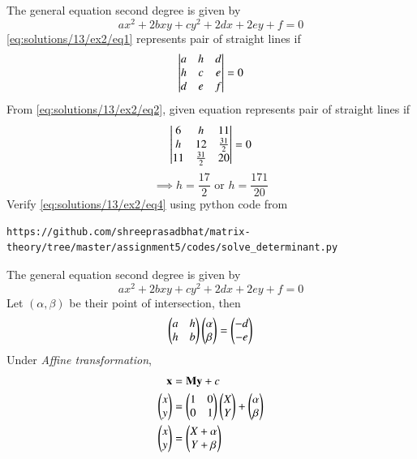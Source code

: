 The general equation second degree is given by
\begin{equation}\label{eq:solutions/13/ex2/eq1}
	ax^2 + 2bxy + cy^2 + 2dx + 2ey + f = 0
\end{equation}
\eqref{eq:solutions/13/ex2/eq1} represents pair of straight lines if
\begin{equation}\label{eq:solutions/13/ex2/eq2}
	\begin{vmatrix} a & h & d\\
			h & c & e\\
			d & e & f\end{vmatrix} = 0
\end{equation}
From \eqref{eq:solutions/13/ex2/eq2}, given equation represents pair of straight lines if 
\begin{equation}\label{eq:solutions/13/ex2/eq3}
	\begin{vmatrix} 6 & h & 11\\
			h & 12 & \frac{31}{2}\\
			11 & \frac{31}{2} & 20\end{vmatrix} = 0
\end{equation}
\begin{equation}\label{eq:solutions/13/ex2/eq4}
	\implies h = \frac{17}{2} \text{ or } h = \frac{171}{20}
\end{equation}
Verify  \eqref{eq:solutions/13/ex2/eq4} using python code from
\begin{lstlisting}
https://github.com/shreeprasadbhat/matrix-theory/tree/master/assignment5/codes/solve_determinant.py
\end{lstlisting}
The general equation second degree is given by
\begin{equation}\label{eq:solutions/13/ex2/eq5}
	ax^2 + 2bxy + cy^2 + 2dx + 2ey + f = 0
\end{equation}
Let $(\alpha,\beta)$ be their point of intersection, then
\begin{equation}\label{eq:solutions/13/ex2/eq6}
	\begin{pmatrix} a & h\\ h & b\end{pmatrix}\begin{pmatrix}\alpha \\ \beta\end{pmatrix} = \begin{pmatrix}-d \\ -e\end{pmatrix}
\end{equation}
Under \textit{Affine transformation},
\begin{align}
	\mathbf{x} &= \mathbf{M}\mathbf{y} + c\\
	\begin{pmatrix}x \\ y\end{pmatrix} &= \begin{pmatrix}1 & 0 \\ 0 & 1\end{pmatrix} \begin{pmatrix}X \\ Y\end{pmatrix} + \begin{pmatrix}\alpha \\ \beta\end{pmatrix}\\
	\label{eq:solutions/13/ex2/eq7}\begin{pmatrix}x \\ y\end{pmatrix} &= \begin{pmatrix}X+\alpha \\ Y+\beta\end{pmatrix}
\end{align}
